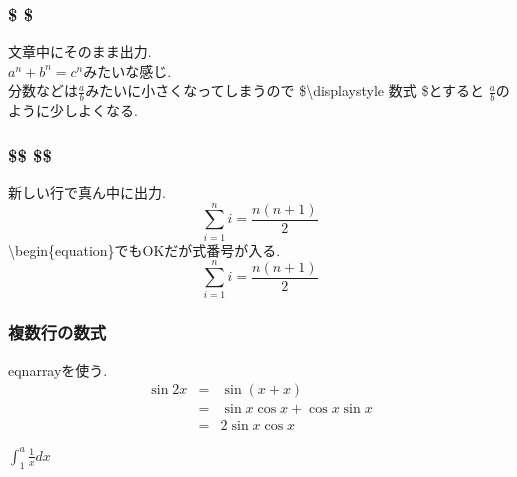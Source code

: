 \documentclass{jarticle}
\begin{document}
   \subsubsection{\$ \$}
   文章中にそのまま出力. \\
   $a^n + b^n = c^n$みたいな感じ. \\
   分数などは$\frac{a}{b}$みたいに小さくなってしまうので
   \$\textbackslash displaystyle 数式 \$とすると
   $\displaystyle \frac{a}{b}$のように少しよくなる.
   
   \subsubsection{\$\$ \$\$}
   新しい行で真ん中に出力.
   $$\sum_{i=1}^{n} i = \frac{n(n+1)}{2}$$
   \textbackslash begin\{equation\}でもOKだが式番号が入る.
   \begin{equation}
    \sum_{i=1}^{n} i = \frac{n(n+1)}{2}
   \end{equation}
   
   \subsubsection{複数行の数式}
   eqnarrayを使う.
   \begin{eqnarray*}
    \sin2x & = & \sin(x + x) \\
    & = & \sin x \cos x + \cos x \sin x \\
    & = & 2\sin x \cos x
   \end{eqnarray*}
   
   
   
   $\displaystyle \int_{1}^{a} \frac{1}{x} dx$
\end{document}
